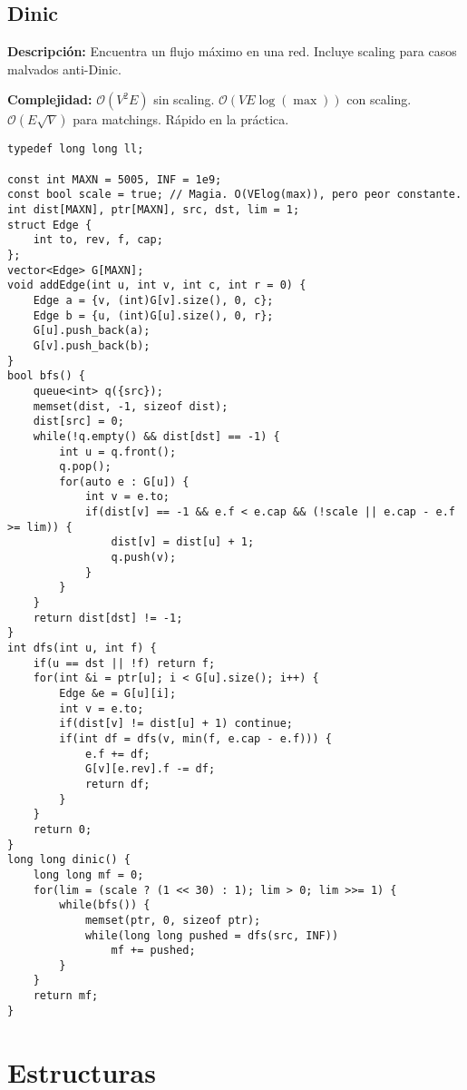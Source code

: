 \documentclass[twocolumn]{article}
\begin{document}
\subsection{Dinic}
\begin{footnotesize}{\bf Descripción:} Encuentra un flujo máximo en una red. Incluye scaling para casos malvados anti-Dinic.


{\bf Complejidad:} $\mathcal{O}(V^2E)$ sin scaling. $\mathcal{O}(VE\log(\max))$ con scaling. $\mathcal{O}(E\sqrt{V})$ para matchings. Rápido en la práctica.
\end{footnotesize}\lstset{basicstyle=\footnotesize\ttfamily,breaklines=true,tabsize=2,language=C++,frame=leftline, numbers=left, numberstyle=\tiny, numbersep=5pt}
\begin{lstlisting}
typedef long long ll;

const int MAXN = 5005, INF = 1e9;
const bool scale = true; // Magia. O(VElog(max)), pero peor constante.
int dist[MAXN], ptr[MAXN], src, dst, lim = 1;
struct Edge {
	int to, rev, f, cap;
};
vector<Edge> G[MAXN];
void addEdge(int u, int v, int c, int r = 0) {
	Edge a = {v, (int)G[v].size(), 0, c};
	Edge b = {u, (int)G[u].size(), 0, r};
	G[u].push_back(a);
	G[v].push_back(b);
}
bool bfs() {
	queue<int> q({src});
	memset(dist, -1, sizeof dist);
	dist[src] = 0;
	while(!q.empty() && dist[dst] == -1) {
		int u = q.front();
		q.pop();
		for(auto e : G[u]) {
			int v = e.to;
			if(dist[v] == -1 && e.f < e.cap && (!scale || e.cap - e.f >= lim)) {
				dist[v] = dist[u] + 1;
				q.push(v);
			}
		}
	}
	return dist[dst] != -1;
}
int dfs(int u, int f) {
	if(u == dst || !f) return f;
	for(int &i = ptr[u]; i < G[u].size(); i++) {
		Edge &e = G[u][i];
		int v = e.to;
		if(dist[v] != dist[u] + 1) continue;
		if(int df = dfs(v, min(f, e.cap - e.f))) {
			e.f += df;
			G[v][e.rev].f -= df;
			return df;
		}
	}
	return 0;
}
long long dinic() {
	long long mf = 0;
	for(lim = (scale ? (1 << 30) : 1); lim > 0; lim >>= 1) {
		while(bfs()) {
			memset(ptr, 0, sizeof ptr);
			while(long long pushed = dfs(src, INF))
				mf += pushed;
		}
	}
	return mf;
}
\end{lstlisting}
\section{Estructuras}
\end{document}
